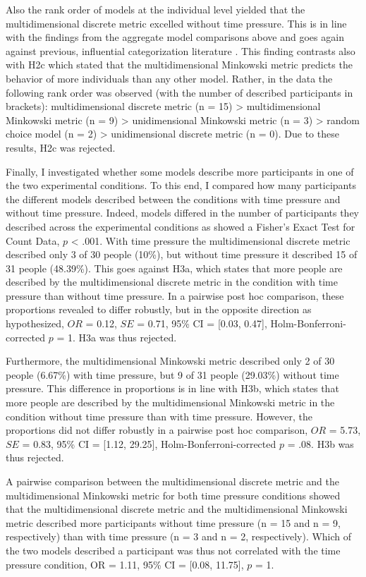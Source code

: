 \documentclass[a4paper,man,natbib]{apa6}
\begin{document}
Also the rank order of models at the individual level yielded that the multidimensional discrete metric excelled without time pressure. This is in line with the findings from the aggregate model comparisons above and goes again against previous, influential categorization literature \citep{nosofsky1986attention, nosofsky1989further, smith1998prototypes, nosofsky1994rule, nosofsky1984choice}. This finding contrasts also with H2c which stated that the multidimensional Minkowski metric predicts the behavior of more individuals than any other model. Rather, in the data the following rank order was observed (with the number of described participants in brackets): multidimensional discrete metric (n = 15) > multidimensional Minkowski metric (n = 9) > unidimensional Minkowski metric (n = 3) > random choice model (n = 2) > unidimensional discrete metric (n = 0). Due to these results, H2c was rejected.

Finally, I investigated whether some models describe more participants in one of the two experimental conditions. To this end, I compared how many participants the different models described between the conditions with time pressure and without time pressure. Indeed, models differed in the number of participants they described across the experimental conditions as showed a Fisher's Exact Test for Count Data, $p$ < .001. With time pressure the multidimensional discrete metric described only 3 of 30 people (10\%), but without time pressure it described 15 of 31 people (48.39\%). This goes against H3a, which states that more people are described by the multidimensional discrete metric in the condition with time pressure than without time pressure. In a pairwise post hoc comparison, these proportions revealed to differ robustly, but in the opposite direction as hypothesized, $OR$ = 0.12, $SE$ = 0.71, 95\% CI = [0.03, 0.47], Holm-Bonferroni-corrected $p$ = 1. H3a was thus rejected.

Furthermore, the multidimensional Minkowski metric described only 2 of 30 people (6.67\%) with time pressure, but 9 of 31 people (29.03\%) without time pressure. This difference in proportions is in line with H3b, which states that more people are described by the multidimensional Minkowski metric in the condition without time pressure than with time pressure. However, the proportions did not differ robustly in a pairwise post hoc comparison, $OR$ = 5.73, $SE$ = 0.83, 95\% CI = [1.12, 29.25], Holm-Bonferroni-corrected $p$ = .08. H3b was thus rejected.

A pairwise comparison between the multidimensional discrete metric and the multidimensional Minkowski metric for both time pressure conditions showed that the multidimensional discrete metric and the multidimensional Minkowski metric described more participants without time pressure (n = 15 and n = 9, respectively) than with time pressure (n = 3 and n = 2, respectively). Which of the two models described a participant was thus not correlated with the time pressure condition, OR = 1.11, 95\% CI = [0.08, 11.75], $p$ = 1.
\end{document}
